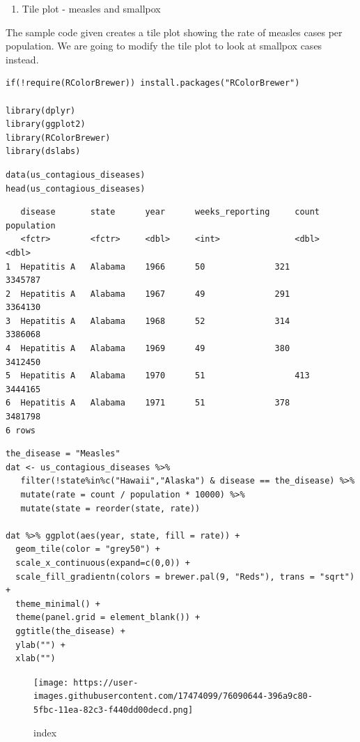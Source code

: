 \documentclass[
]{article}
\providecommand{\tightlist}{%
  \setlength{\itemsep}{0pt}\setlength{\parskip}{0pt}}
\begin{document}
\begin{enumerate}
\def\labelenumi{\arabic{enumi}.}
\tightlist
\item
  Tile plot - measles and smallpox
\end{enumerate}

The sample code given creates a tile plot showing the rate of measles
cases per population. We are going to modify the tile plot to look at
smallpox cases instead.

\begin{verbatim}
if(!require(RColorBrewer)) install.packages("RColorBrewer")

library(dplyr)
library(ggplot2)
library(RColorBrewer)
library(dslabs)
\end{verbatim}

\begin{verbatim}
data(us_contagious_diseases)
head(us_contagious_diseases)
\end{verbatim}

\begin{verbatim}
   disease       state      year      weeks_reporting     count      population
   <fctr>        <fctr>     <dbl>     <int>               <dbl>      <dbl>
1  Hepatitis A   Alabama    1966      50              321        3345787
2  Hepatitis A   Alabama    1967      49              291        3364130
3  Hepatitis A   Alabama    1968      52              314        3386068
4  Hepatitis A   Alabama    1969      49              380        3412450
5  Hepatitis A   Alabama    1970      51                  413        3444165
6  Hepatitis A   Alabama    1971      51              378        3481798
6 rows
\end{verbatim}

\begin{verbatim}
the_disease = "Measles"
dat <- us_contagious_diseases %>% 
   filter(!state%in%c("Hawaii","Alaska") & disease == the_disease) %>% 
   mutate(rate = count / population * 10000) %>% 
   mutate(state = reorder(state, rate))

dat %>% ggplot(aes(year, state, fill = rate)) + 
  geom_tile(color = "grey50") + 
  scale_x_continuous(expand=c(0,0)) + 
  scale_fill_gradientn(colors = brewer.pal(9, "Reds"), trans = "sqrt") + 
  theme_minimal() + 
  theme(panel.grid = element_blank()) + 
  ggtitle(the_disease) + 
  ylab("") + 
  xlab("")
\end{verbatim}

\begin{figure}
\centering
\texttt{[image: https://user-images.githubusercontent.com/17474099/76090644-396a9c80-5fbc-11ea-82c3-f440dd00decd.png]}
\caption{index}
\end{figure}
\end{document}
